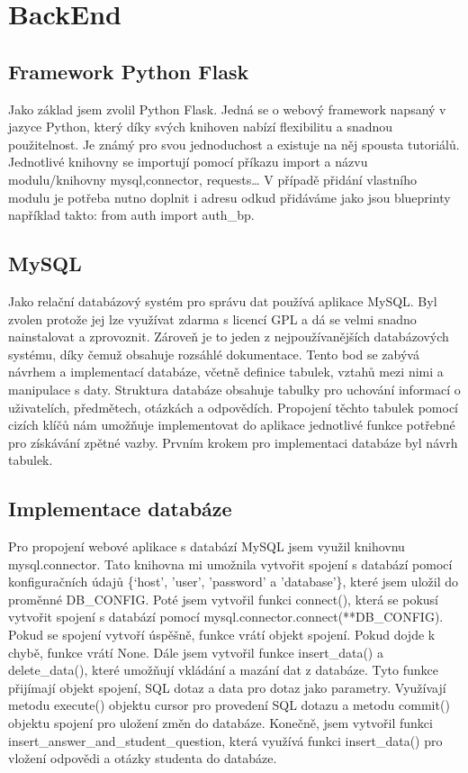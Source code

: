 \documentclass[11pt,a4paper,twoside,openright]{report}
\begin{document}
{\chapter{BackEnd}

\section{Framework Python Flask}
Jako základ jsem zvolil Python Flask. Jedná se o webový framework napsaný v jazyce Python, který díky svých knihoven nabízí flexibilitu a snadnou použitelnost. Je známý pro svou jednoduchost a existuje na něj spousta tutoriálů. Jednotlivé knihovny se importují pomocí příkazu import a názvu modulu/knihovny mysql,connector, requests… V případě přidání vlastního modulu je potřeba nutno doplnit i adresu odkud přidáváme jako jsou blueprinty například takto: from auth import auth\_bp.

\section{MySQL}
Jako relační databázový systém pro správu dat používá aplikace MySQL. Byl zvolen protože jej lze využívat zdarma s licencí GPL a dá se velmi snadno nainstalovat a zprovoznit. Zároveň je to jeden z nejpoužívanějších databázových systému, díky čemuž obsahuje rozsáhlé dokumentace. Tento bod se zabývá návrhem a implementací databáze, včetně definice tabulek, vztahů mezi nimi a manipulace s daty. Struktura databáze obsahuje tabulky pro uchování informací o uživatelích, předmětech, otázkách a odpovědích. Propojení těchto tabulek pomocí cizích klíčů nám umožňuje implementovat do aplikace jednotlivé funkce potřebné pro získávání zpětné vazby. Prvním krokem pro implementaci databáze byl návrh tabulek.

\section{Implementace databáze}

Pro propojení webové aplikace s databází MySQL jsem využil knihovnu mysql.connector. Tato knihovna mi umožnila vytvořit spojení s databází pomocí konfiguračních údajů \{‘host’, ’user’, ’password’ a ’database’\}, které jsem uložil do proměnné DB\_CONFIG.
Poté jsem vytvořil funkci connect(), která se pokusí vytvořit spojení s databází pomocí mysql.connector.connect(**DB\_CONFIG). Pokud se spojení vytvoří úspěšně, funkce vrátí objekt spojení. Pokud dojde k chybě, funkce vrátí None.
Dále jsem vytvořil funkce insert\_data() a delete\_data(), které umožňují vkládání a mazání dat z databáze. Tyto funkce přijímají objekt spojení, SQL dotaz a data pro dotaz jako parametry. Využívají metodu execute() objektu cursor pro provedení SQL dotazu a metodu commit() objektu spojení pro uložení změn do databáze.
Konečně, jsem vytvořil funkci insert\_answer\_and\_student\_question, která využívá funkci insert\_data() pro vložení odpovědi a otázky studenta do databáze.

}
\end{document}
